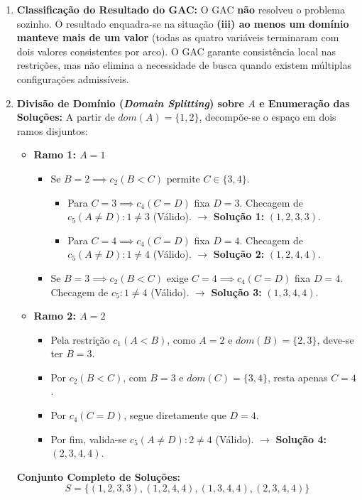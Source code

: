 \begin{enumerate}[label=(\alph*), resume]
    \item \textbf{Classificação do Resultado do GAC:}
    O GAC \textbf{não} resolveu o problema sozinho. O resultado enquadra-se na situação \textbf{(iii) ao menos um domínio manteve mais de um valor} (todas as quatro variáveis terminaram com dois valores consistentes por arco). O GAC garante consistência local nas restrições, mas não elimina a necessidade de busca quando existem múltiplas configurações admissíveis.

    \item \textbf{Divisão de Domínio (\textit{Domain Splitting}) sobre $A$ e Enumeração das Soluções:}
    A partir de $dom(A) = \{1, 2\}$, decompõe-se o espaço em dois ramos disjuntos:
    \begin{itemize}
        \item \textbf{Ramo 1: $A = 1$}
        \begin{itemize}
            \item Se $B = 2 \implies c_2 (B < C)$ permite $C \in \{3, 4\}$.
            \begin{itemize}
                \item Para $C = 3 \implies c_4 (C = D)$ fixa $D = 3$. Checagem de $c_5 (A \neq D): 1 \neq 3$ (Válido). $\rightarrow$ \textbf{Solução 1:} $(1, 2, 3, 3)$.
                \item Para $C = 4 \implies c_4 (C = D)$ fixa $D = 4$. Checagem de $c_5 (A \neq D): 1 \neq 4$ (Válido). $\rightarrow$ \textbf{Solução 2:} $(1, 2, 4, 4)$.
            \end{itemize}
            \item Se $B = 3 \implies c_2 (B < C)$ exige $C = 4 \implies c_4 (C = D)$ fixa $D = 4$. Checagem de $c_5: 1 \neq 4$ (Válido). $\rightarrow$ \textbf{Solução 3:} $(1, 3, 4, 4)$.
        \end{itemize}
        \item \textbf{Ramo 2: $A = 2$}
        \begin{itemize}
            \item Pela restrição $c_1 (A < B)$, como $A = 2$ e $dom(B) = \{2, 3\}$, deve-se ter $B = 3$.
            \item Por $c_2 (B < C)$, com $B = 3$ e $dom(C) = \{3, 4\}$, resta apenas $C = 4$.
            \item Por $c_4 (C = D)$, segue diretamente que $D = 4$.
            \item Por fim, valida-se $c_5 (A \neq D): 2 \neq 4$ (Válido). $\rightarrow$ \textbf{Solução 4:} $(2, 3, 4, 4)$.
        \end{itemize}
    \end{itemize}
    \textbf{Conjunto Completo de Soluções:}
    \begin{equation*}
        S = \{(1, 2, 3, 3), (1, 2, 4, 4), (1, 3, 4, 4), (2, 3, 4, 4)\}
    \end{equation*}


\end{enumerate}
